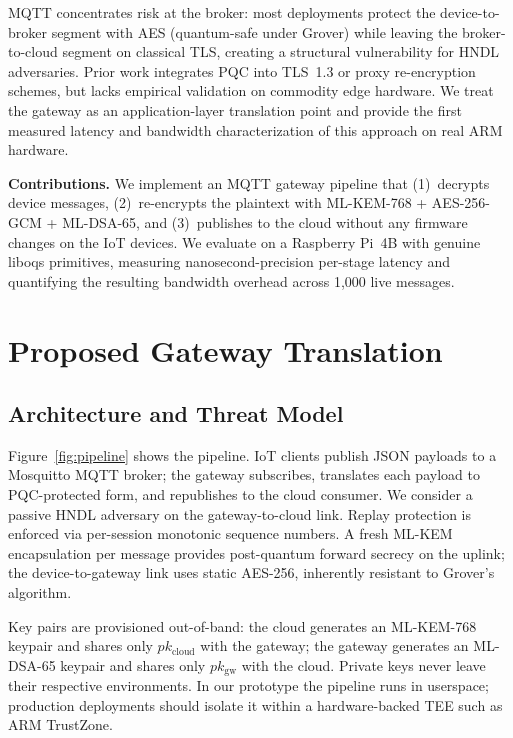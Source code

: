 \documentclass[conference]{IEEEtran}
\begin{document}
MQTT concentrates risk at the broker: most deployments protect the device-to-broker segment with AES (quantum-safe under Grover) while leaving the broker-to-cloud segment on classical TLS, creating a structural vulnerability for HNDL adversaries. Prior work integrates PQC into TLS~1.3 or proxy re-encryption schemes, but lacks empirical validation on commodity edge hardware. We treat the gateway as an application-layer translation point and provide the first measured latency and bandwidth characterization of this approach on real ARM hardware.

\textbf{Contributions.} We implement an MQTT gateway pipeline that (1)~decrypts device messages, (2)~re-encrypts the plaintext with ML-KEM-768 + AES-256-GCM + ML-DSA-65, and (3)~publishes to the cloud without any firmware changes on the IoT devices. We evaluate on a Raspberry Pi~4B with genuine liboqs primitives, measuring nanosecond-precision per-stage latency and quantifying the resulting bandwidth overhead across 1,000 live messages.

\section{Proposed Gateway Translation}

\subsection{Architecture and Threat Model}

Figure~\ref{fig:pipeline} shows the pipeline. IoT clients publish JSON payloads to a Mosquitto MQTT broker; the gateway subscribes, translates each payload to PQC-protected form, and republishes to the cloud consumer. We consider a passive HNDL adversary on the gateway-to-cloud link. Replay protection is enforced via per-session monotonic sequence numbers. A fresh ML-KEM encapsulation per message provides post-quantum forward secrecy on the uplink; the device-to-gateway link uses static AES-256, inherently resistant to Grover's algorithm.

Key pairs are provisioned out-of-band: the cloud generates an ML-KEM-768 keypair and shares only $pk_\text{cloud}$ with the gateway; the gateway generates an ML-DSA-65 keypair and shares only $pk_\text{gw}$ with the cloud. Private keys never leave their respective environments. In our prototype the pipeline runs in userspace; production deployments should isolate it within a hardware-backed TEE such as ARM TrustZone.
\end{document}
